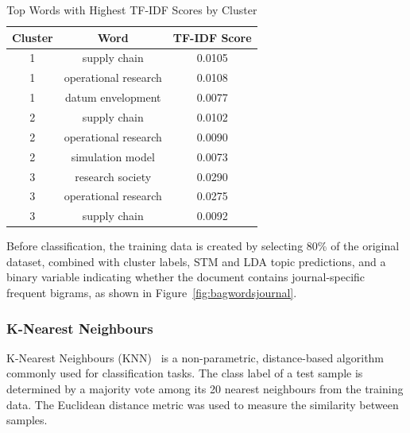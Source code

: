 \documentclass[9pt,twocolumn,twoside]{pnas-new}
\begin{document}
\begin{table}[h]
\centering
\caption{Top Words with Highest TF-IDF Scores by Cluster}
\begin{tabular}{ccc}
\hline
\textbf{Cluster} & \textbf{Word} & \textbf{TF-IDF Score} \\
\hline
1 & supply chain        & 0.0105 \\
1 & operational research & 0.0108 \\
1 & datum envelopment    & 0.0077 \\
2 & supply chain        & 0.0102 \\
2 & operational research & 0.0090 \\
2 & simulation model     & 0.0073 \\
3 & research society    & 0.0290 \\
3 & operational research & 0.0275 \\
3 & supply chain        & 0.0092 \\
\hline
\end{tabular}
\label{tab:top_words_tfidf}
\end{table}


\begin{table}[h]
\centering
\caption{Number of Articles by Journal and Cluster}
\label{tab:journal_cluster_counts}
\end{table}


Before classification, the training data is created by selecting 80\% of the original dataset, combined with cluster labels, STM and LDA topic predictions, and a binary variable indicating whether the document contains journal-specific frequent bigrams, as shown in Figure~\ref{fig:bagwordsjournal}. 

\subsubsection*{K-Nearest Neighbours}

K-Nearest Neighbours (KNN)~\cite{Mucherino2009} is a non-parametric, distance-based algorithm commonly used for classification tasks. The class label of a test sample is determined by a majority vote among its 20 nearest neighbours from the training data. The Euclidean distance metric was used to measure the similarity between samples.
\end{document}
